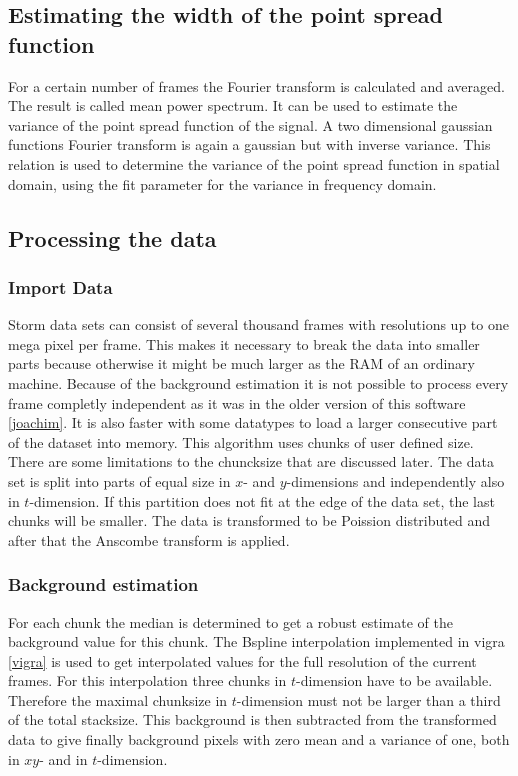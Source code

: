 \subsection{Estimating the width of the point spread function}
For a certain number of frames the Fourier transform is calculated and averaged. The result is called mean power spectrum. It can be used to estimate the variance of the point spread function of the signal. A two dimensional gaussian functions Fourier transform is again a gaussian but with inverse variance. This relation is used to determine the variance of the point spread function in spatial domain, using the fit parameter for the variance in frequency domain.
\subsection{Processing the data}
\subsubsection{Import Data}
Storm data sets can consist of several thousand frames with resolutions up to one mega pixel per frame. This makes it necessary to break the data into smaller parts because otherwise it might be much larger as the RAM of an ordinary machine. Because of the background estimation it is not possible to process every frame completly independent as it was in the older version of this software \ref{joachim}. It is also faster with some datatypes to load a larger consecutive part of the dataset into memory.\newline
This algorithm uses chunks of user defined size. There are some limitations to the chuncksize that are discussed later. The data set is split into parts of equal size in $x$- and $y$-dimensions and independently also in $t$-dimension. If this partition does not fit at the edge of the data set, the last chunks will be smaller.\newline
The data is transformed to be Poission distributed and after that the Anscombe transform is applied.
\subsubsection{Background estimation}
For each chunk the median is determined to get a robust estimate of the background value for this chunk. 
The Bspline interpolation implemented in vigra \ref{vigra} is used to get interpolated values for the full resolution of the current frames. For this interpolation three chunks in $t$-dimension have to be available. Therefore the maximal chunksize in $t$-dimension must not be larger than a third of the total stacksize.\newline
This background is then subtracted from the transformed data to give finally background pixels with zero mean and a variance of one, both in $xy$- and in $t$-dimension.
